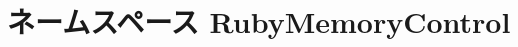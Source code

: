 \hypertarget{namespaceRubyMemoryControl}{
\section{ネームスペース RubyMemoryControl}
\label{namespaceRubyMemoryControl}
}
